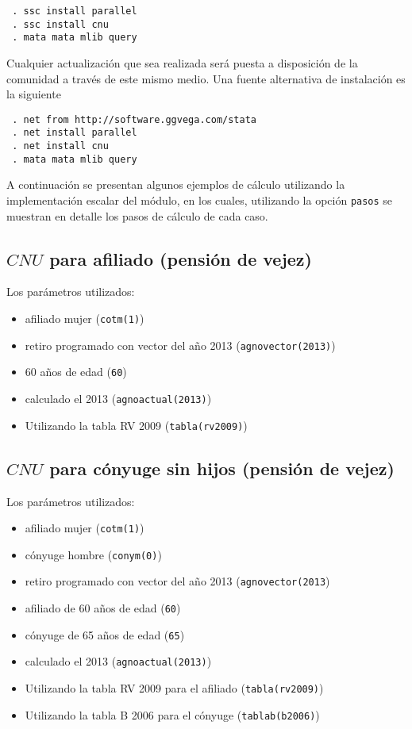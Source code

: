 \documentclass[letterpaper, 11pt]{article}
\begin{document}
\begin{verbatim}
 . ssc install parallel
 . ssc install cnu
 . mata mata mlib query
\end{verbatim}

Cualquier actualizaci\'on que sea realizada ser\'a puesta a disposici\'on de la
comunidad a trav\'es de este mismo medio. Una fuente alternativa de instalaci\'on
es la siguiente

\begin{verbatim}
 . net from http://software.ggvega.com/stata
 . net install parallel
 . net install cnu
 . mata mata mlib query
\end{verbatim}

A continuaci\'on se presentan algunos ejemplos de c\'alculo utilizando la implementaci\'on
escalar del m\'odulo, en los cuales, utilizando la opci\'on {\tt pasos} se muestran en 
detalle los pasos de c\'alculo de cada caso.

\subsection{$CNU$ para afiliado (pensi\'on de vejez)\label{sec:ej:cnu_afili}}

Los par\'ametros utilizados:
\begin{itemize}
\item afiliado mujer ({\tt cotm(1)})
\item retiro programado con vector del a\~no 2013 ({\tt agnovector(2013)})
\item 60 a\~nos de edad ({\tt 60})
\item calculado el 2013 ({\tt agnoactual(2013)})
\item Utilizando la tabla RV 2009 ({\tt tabla(rv2009)})
\end{itemize}

\begin{stlog}

\end{stlog}

\subsection{$CNU$ para c\'onyuge sin hijos (pensi\'on de vejez)\label{sec:ej:cnu_cnyg_s_hi}}

Los par\'ametros utilizados:
\begin{itemize}
\item afiliado mujer ({\tt cotm(1)})
\item c\'onyuge hombre ({\tt conym(0)})
\item retiro programado con vector del a\~no 2013 ({\tt agnovector(2013})
\item afiliado de 60 a\~nos de edad ({\tt 60})
\item c\'onyuge de 65 a\~nos de edad ({\tt 65})
\item calculado el 2013 ({\tt agnoactual(2013)})
\item Utilizando la tabla RV 2009 para el afiliado ({\tt tabla(rv2009)})
\item Utilizando la tabla B 2006 para el c\'onyuge ({\tt tablab(b2006)})
\end{itemize}
\end{document}
